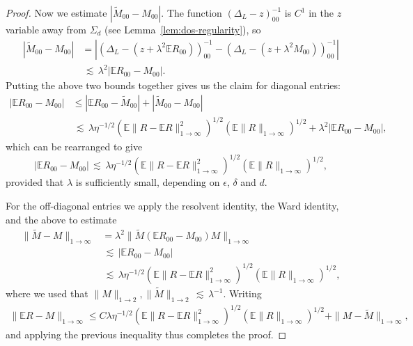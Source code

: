\documentclass[11pt]{amsart}
\def\Expec{{\mathbb E}}
\def\lsim{{\,\lesssim\,}}
\numberwithin{equation}{section}
\numberwithin{theorem}{section}
\begin{document}
\begin{proof}
Now we estimate $|\tilde{M}_{00} - M_{00}|$. The function $(\Delta_{L}-z)^{-1}_{00}$ is  $C^1$ in the $z$ variable away from $\Sigma_d$
(see Lemma~\ref{lem:dos-regularity}), so
\begin{align*}
    |\tilde{M}_{00} - M_{00}|
&= |(\Delta_{L} - (z+\lambda^2\Expec R_{00}))^{-1}_{00}
- (\Delta_L - (z+\lambda^2 M_{00}))^{-1}_{00}| \\
&\lsim \lambda^2 |\Expec R_{00} - M_{00}|.
\end{align*}
Putting the above two bounds together gives us the claim for diagonal entries:
\begin{align*}
|\Expec  R_{00} - M_{00}|
&\leq |\Expec R_{00} - \tilde{M}_{00}| + |\tilde{M}_{00}-M_{00}| \\
&\lsim \lambda\eta^{-1 / 2} \left(  \Expec \|R-\Expec R\|_{1\to \infty}^{2}\right) ^{1/ 2}
\left( \Expec\|R\|_{1\to \infty} \right)^{1 /2}
 + \lambda^2 |\Expec R_{00} - M_{00}|,
\end{align*}
which can be rearranged to give
\[
|\Expec R_{00} - M_{00}| \lsim
\lambda\eta^{-1 / 2} \left(  \Expec \|R-\Expec R\|_{1\to \infty}^{2}\right) ^{1/ 2}
\left( \Expec\|R\|_{1\to \infty} \right)^{1 /2},
\]
provided that $\lambda$ is sufficiently small, depending on $\epsilon$, $\delta$ and $d$.

For the off-diagonal entries we apply the resolvent identity, the Ward identity,
and the above to estimate
\begin{align*}
\|\tilde{M}-M\|_{1\to\infty}
& =\lambda^{2}\|\tilde{M}(\Expec R_{00}-M_{00})M\|_{1\to\infty}\\
& \lsim |\mathbb{E}R_{00}-M_{00}|\\
& \lsim \lambda\eta^{-1 / 2} \left(  \Expec \|R-\Expec R\|_{1\to \infty}^{2}\right) ^{1/ 2}
\left( \Expec\|R\|_{1\to \infty} \right)^{1 /2},
\end{align*}
where we used that $\|M\|_{1\to 2}, \|\tilde{M}\|_{1\to 2}\lsim \lambda^{-1}.$
Writing
\begin{align*}
\|\Expec R-M\|_{1\to \infty}\leq C\lambda\eta^{-1 / 2}
\left(  \Expec \|R-\Expec R\|_{1\to \infty}^{2}\right) ^{1/ 2}
\left( \Expec\|R\|_{1\to \infty} \right)^{1 /2}
+\|M-\tilde{M}\|_{1\to \infty},
\end{align*}
and applying the previous inequality thus completes the proof.
\end{proof}
\end{document}
